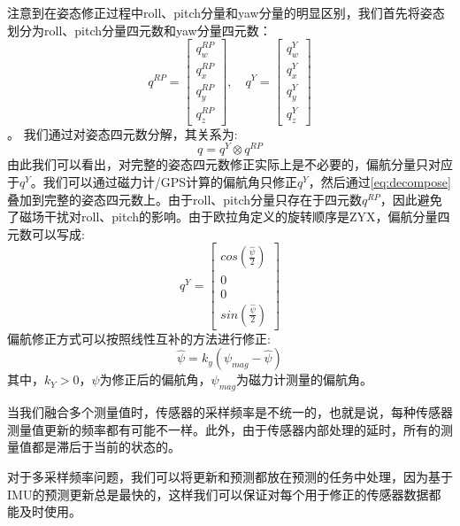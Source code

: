 \documentclass[
  type=master
]{gdutthesis}
\begin{document}
注意到在姿态修正过程中roll、pitch分量和yaw分量的明显区别，我们首先将姿态划分为roll、pitch分量四元数和yaw分量四元数：
\[
q^{RP} = 
\begin{bmatrix}
	q_w^{RP} \\
	q_x^{RP} \\
	q_y^{RP} \\
	q_z^{RP}
\end{bmatrix},
\hspace{1em}
q^{Y} = 
\begin{bmatrix}
	q_w^{Y} \\
	q_x^{Y} \\
	q_y^{Y} \\
	q_z^{Y}
\end{bmatrix}
\]。
我们通过对姿态四元数分解，其关系为:
\begin{equation}\label{eq:decompose}
	q = q^{Y} \otimes q^{RP}	
\end{equation}
由此我们可以看出，对完整的姿态四元数修正实际上是不必要的，偏航分量只对应于$q^{Y}$。我们可以通过磁力计/GPS计算的偏航角只修正$q^{Y}$，然后通过\autoref{eq:decompose}叠加到完整的姿态四元数上。由于roll、pitch分量只存在于四元数$q^{RP}$，因此避免了磁场干扰对roll、pitch的影响。由于欧拉角定义的旋转顺序是ZYX，偏航分量四元数可以写成:
\begin{equation}
	q^{Y} = 
	\begin{bmatrix}
		cos(\frac{\hat{\psi}}{2}) \\
		0 \\
		0 \\
		sin(\frac{\hat{\psi}}{2})
	\end{bmatrix}	
\end{equation}
偏航修正方式可以按照线性互补的方法进行修正:
\begin{equation}
	\hat{\psi} = k_y (\psi_{mag} - \hat{\psi}) 	
\end{equation}
其中，$k_Y > 0$，$\hat{\psi}$为修正后的偏航角，$\psi_{mag}$为磁力计测量的偏航角。

当我们融合多个测量值时，传感器的采样频率是不统一的，也就是说，每种传感器测量值更新的频率都有可能不一样。此外，由于传感器内部处理的延时，所有的测量值都是滞后于当前的状态的。

对于多采样频率问题，我们可以将更新和预测都放在预测的任务中处理，因为基于IMU的预测更新总是最快的，这样我们可以保证对每个用于修正的传感器数据都能及时使用。
\end{document}
